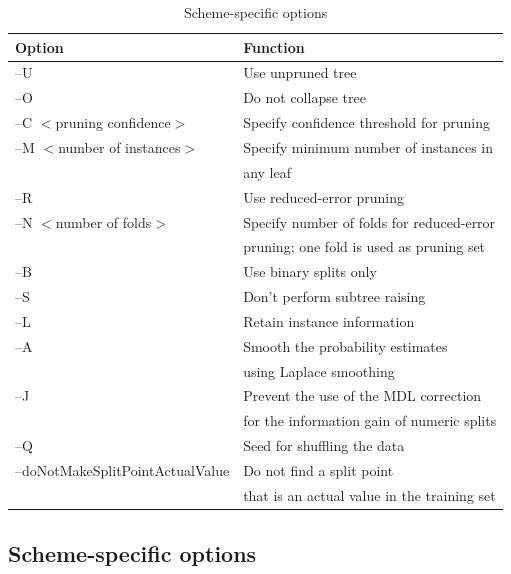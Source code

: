 \begin{table}[!thp]
\footnotesize
{\centering \begin{tabular}{ll}
\hline
Option & Function \\
\hline
--U & Use unpruned tree \\
--O & Do not collapse tree \\
--C $<$pruning confidence$>$ & Specify confidence threshold for pruning \\
--M $<$number of instances$>$ & Specify minimum number of instances in \\
& any leaf \\
--R & Use reduced-error pruning \\
--N $<$number of folds$>$ & Specify number of folds for reduced-error \\
& pruning; one fold is used as pruning set \\
--B & Use binary splits only \\
--S & Don't perform subtree raising \\
--L & Retain instance information \\
--A & Smooth the probability estimates \\
& using Laplace smoothing \\
--J & Prevent the use of the MDL correction \\
& for the information gain of numeric splits\\
--Q & Seed for shuffling the data \\
--doNotMakeSplitPointActualValue & Do not find a split point \\
& that is an actual value in the training set\\
\hline
\end{tabular} \footnotesize \par}
\caption{\label{table:j48_command_line_opts}Scheme-specific options}
\end{table}

\subsection{Scheme-specific options}

